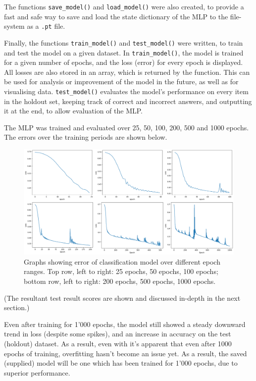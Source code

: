 \documentclass[a4paper, oneside, 11pt]{article}
\begin{document}
\bigskip
\noindent
The functions \texttt{save\_model()} and \texttt{load\_model()} were also created, to provide a fast and safe way to save and load the state dictionary of the MLP to the file-system as a \texttt{.pt} file. 

\bigskip
\noindent
Finally, the functions \texttt{train\_model()} and \texttt{test\_model()} were written, to train and test the model on a given dataset. In \texttt{train\_model()}, the model is trained for a given number of epochs, and the loss (error) for every epoch is displayed. All losses are also stored in an array, which is returned by the function. This can be used for analysis or improvement of the model in the future, as well as for visualising data. \texttt{test\_model()} evaluates the model's performance on every item in the holdout set, keeping track of correct and incorrect answers, and outputting it at the end, to allow evaluation of the MLP. 

\bigskip
\noindent
The MLP was trained and evaluated over 25, 50, 100, 200, 500 and 1000 epochs. The errors over the training periods are shown below.

\bigskip
\begin{figure}[ht]
    \centering
    \includegraphics[scale = 0.59]{img/all_epochs.png}
    \caption{Graphs showing error of classification model over different epoch ranges. Top row, left to right: 25 epochs, 50 epochs, 100 epochs; bottom row, left to right: 200 epochs, 500 epochs, 1000 epochs.}
    \label{fig:all_epochs}
\end{figure}

\bigskip
\noindent
(The resultant test result scores are shown and discussed in-depth in the next section.)

\bigskip
\noindent
Even after training for 1'000 epochs, the model still showed a steady downward trend in loss (despite some spikes), and an increase in accuracy on the test (holdout) dataset. As a result, even with it's apparent that even after 1000 epochs of training, overfitting hasn't become an issue yet. As a result, the saved (supplied) model will be one which has been trained for 1'000 epochs, due to superior performance.
\end{document}
